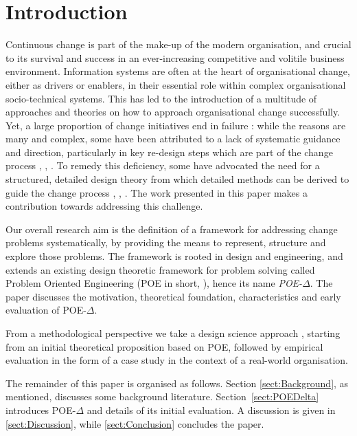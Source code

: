 \documentclass[runningheads,a4paper]{llncs}
\begin{document}
\section{Introduction}
Continuous change is part of the make-up of the  modern organisation, and crucial to its survival and success in an ever-increasing competitive and volitile business environment. Information systems are often at the heart of organisational change, either as drivers or enablers, in their essential role within complex organisational socio-technical systems. This has led to the introduction of a multitude of approaches and theories on how to approach organisational change successfully. Yet, a large proportion of change initiatives end in failure \cite{burnes2011success}: while the reasons are many and complex, some have been attributed to a lack of systematic guidance and direction, particularly in key re-design steps which are part of the change process \cite{doi:10.1108/14637159910249117}, \cite{Reijers2005283}, \cite{Gerrits:1994:BMB:646303.686971}. To remedy this deficiency, some have advocated the need for a structured, detailed design theory from which detailed methods can be derived to guide the change process \cite{verkerk2004trust}, \cite{Kleiner:2000vm}, \cite{By:2005fm}. The work presented in this paper makes a contribution towards addressing this challenge.

Our overall research aim is the definition of a framework for addressing change problems systematically, by providing the means to represent, structure and  explore those problems. The framework is rooted in design and engineering, and extends an existing design theoretic framework for problem solving called Problem Oriented Engineering (POE in short, \cite{Hall2012ISSE}), hence its name {\it POE-$\Delta$}. The paper discusses the motivation, theoretical foundation, characteristics and early evaluation of POE-$\Delta$.

From a methodological perspective we take a design science approach \cite{Hevner:2010ua}, starting from an initial theoretical proposition based on POE, followed by empirical evaluation in the form of a case study in the context of a real-world organisation. 

The remainder of this paper is organised as follows. Section \ref{sect:Background}, as mentioned, discusses some background literature. Section~\ref{sect:POEDelta} introduces POE-$\Delta$ and details of its initial evaluation. A discussion is given in  \ref{sect:Discussion}, while \ref{sect:Conclusion} concludes the paper. 
\end{document}
